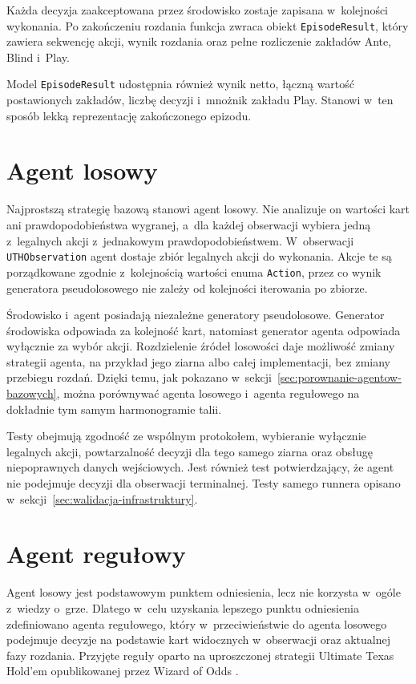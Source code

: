 Każda decyzja zaakceptowana przez środowisko zostaje zapisana w~kolejności
wykonania. Po zakończeniu rozdania funkcja zwraca obiekt
\texttt{EpisodeResult}, który zawiera sekwencję akcji, wynik rozdania
oraz pełne rozliczenie zakładów Ante, Blind i~Play.

Model \texttt{EpisodeResult} udostępnia również wynik netto, łączną
wartość postawionych zakładów, liczbę decyzji i~mnożnik zakładu Play.
Stanowi w~ten sposób lekką reprezentację zakończonego epizodu.

\section{Agent losowy}
\label{sec:agent-losowy}

Najprostszą strategię bazową stanowi agent losowy. Nie analizuje on
wartości kart ani prawdopodobieństwa wygranej, a~dla każdej obserwacji
wybiera jedną z~legalnych akcji z~jednakowym prawdopodobieństwem. W~obserwacji \texttt{UTHObservation} agent
dostaje zbiór legalnych akcji do wykonania. Akcje te są porządkowane
zgodnie z~kolejnością wartości enuma \texttt{Action}, przez co wynik
generatora pseudolosowego nie zależy od kolejności iterowania po zbiorze.

Środowisko i~agent posiadają niezależne generatory pseudolosowe. Generator
środowiska odpowiada za kolejność kart, natomiast generator agenta odpowiada
wyłącznie za wybór akcji. Rozdzielenie źródeł losowości daje
możliwość zmiany strategii agenta, na przykład jego ziarna albo całej
implementacji, bez zmiany przebiegu rozdań. Dzięki temu, jak pokazano
w~sekcji~\ref{sec:porownanie-agentow-bazowych}, można porównywać agenta
losowego i~agenta regułowego na dokładnie tym samym harmonogramie talii.

Testy obejmują zgodność ze wspólnym protokołem, wybieranie
wyłącznie legalnych akcji, powtarzalność decyzji dla tego samego ziarna oraz
obsługę niepoprawnych danych wejściowych. Jest również test potwierdzający,
że agent nie podejmuje decyzji dla obserwacji terminalnej. Testy samego
runnera opisano w~sekcji~\ref{sec:walidacja-infrastruktury}.

\section{Agent regułowy}
\label{sec:agent-regulowy}

Agent losowy jest podstawowym punktem odniesienia, lecz nie korzysta w~ogóle z~wiedzy o~grze.
Dlatego w~celu uzyskania lepszego punktu odniesienia zdefiniowano agenta regułowego,
który w~przeciwieństwie do
agenta losowego podejmuje decyzje na podstawie kart widocznych
w~obserwacji oraz aktualnej fazy rozdania. Przyjęte reguły oparto na
uproszczonej strategii Ultimate Texas Hold'em opublikowanej przez
Wizard of Odds \cite{wizard_uth}.

